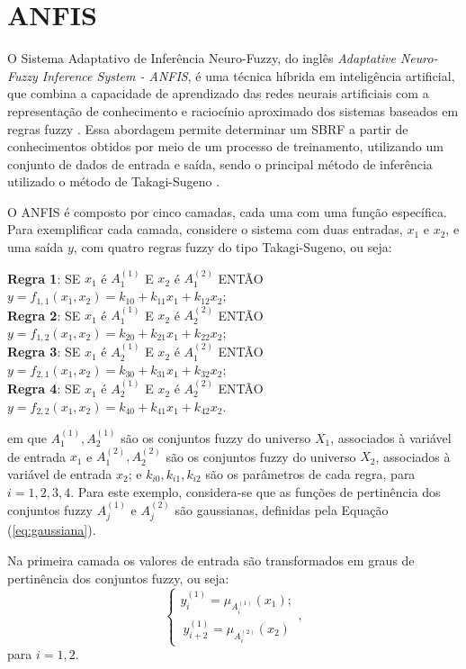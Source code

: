 \section{ANFIS}
\label{anfis}
O Sistema Adaptativo de Inferência Neuro-Fuzzy, do inglês \textit{Adaptative Neuro-Fuzzy Inference System - ANFIS}, é uma técnica híbrida em inteligência artificial, que combina a capacidade de aprendizado das redes neurais artificiais com a representação de conhecimento e raciocínio aproximado dos sistemas baseados em regras fuzzy \cite{fuzzy}. Essa abordagem permite determinar um SBRF a partir de conhecimentos obtidos por meio de um processo de treinamento, utilizando um conjunto de dados de entrada e saída, sendo o principal método de inferência utilizado o método de Takagi-Sugeno \cite{Jang1993}. 

O ANFIS é composto por cinco camadas, cada uma com uma função específica. Para exemplificar cada camada, considere o sistema com duas entradas, $x_1$ e $x_2$, e uma saída $y$, com quatro regras fuzzy do tipo Takagi-Sugeno, ou seja:
\begin{center}
\textbf{Regra 1}: SE $x_1$ é $A^{(1)}_1$ E $x_2$ é $A^{(2)}_1$ ENTÃO $y = f_{1,1}(x_1, x_2) = k_{10} + k_{11}x_1 + k_{12}x_2$; \\
\textbf{Regra 2}: SE $x_1$ é $A^{(1)}_1$ E $x_2$ é $A^{(2)}_2$ ENTÃO $y = f_{1,2}(x_1, x_2) = k_{20} + k_{21}x_1 + k_{22}x_2$; \\
\textbf{Regra 3}: SE $x_1$ é $A^{(1)}_2$ E $x_2$ é $A^{(2)}_1$ ENTÃO $y = f_{2,1}(x_1, x_2) = k_{30} + k_{31}x_1 + k_{32}x_2$; \\
\textbf{Regra 4}: SE $x_1$ é $A^{(1)}_2$ E $x_2$ é $A^{(2)}_2$ ENTÃO $y = f_{2,2}(x_1, x_2) = k_{40} + k_{41}x_1 + k_{42}x_2$.
\end{center}
em que $A^{(1)}_1, A^{(1)}_2$ são os conjuntos fuzzy do universo $X_1$, associados à variável de entrada $x_1$ e $A^{(2)}_1, A^{(2)}_2$ são os conjuntos fuzzy do universo $X_2$, associados à variável de entrada $x_2$; e $k_{i0}, k_{i1}, k_{i2}$ são os parâmetros de cada regra, para $i = 1, 2, 3, 4$. Para este exemplo, considera-se que as funções de pertinência dos conjuntos fuzzy $A^{(1)}_j$ e $A^{(2)}_j$ são gaussianas, definidas pela Equação (\ref{eq:gaussiana}).

Na primeira camada os valores de entrada são transformados em graus de pertinência dos conjuntos fuzzy, ou seja:
$$
\begin{cases}
y^{(1)}_i = \mu_{A^{(1)}_i}(x_1); \\    
\ y^{(1)}_{i+2} = \mu_{A^{(2)}_i}(x_2)
\end{cases},
$$
para $i = 1, 2$. 

